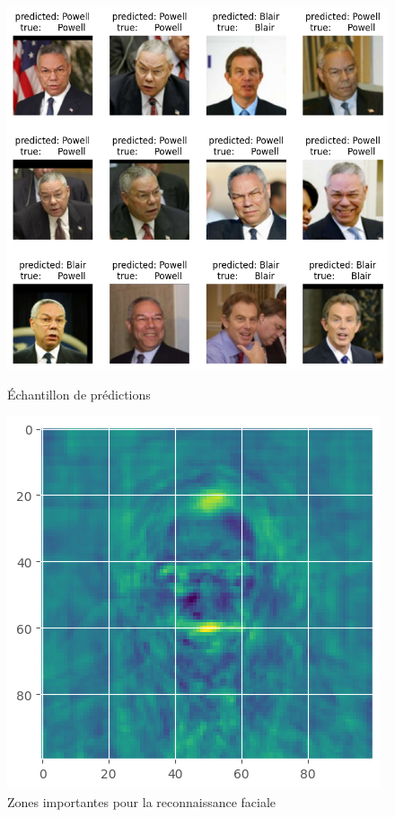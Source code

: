 \documentclass[11pt,a4paper]{article}
\begin{document}
\begin{figure}[H]
    \centering
    \begin{minipage}{0.45\textwidth}
        \centering
        \includegraphics[width=\textwidth]{images_plot/predictnom.png}
        \caption{Échantillon de prédictions}
        \label{fig:image1}
    \end{minipage}
    \hfill
    \begin{minipage}{0.45\textwidth}
        \centering
        \includegraphics[width=\textwidth]{images_plot/heatmap.png}
        \caption{Zones importantes pour la reconnaissance faciale}
        \label{fig:image2}
    \end{minipage}
    \label{fig:images}
\end{figure}
\end{document}
